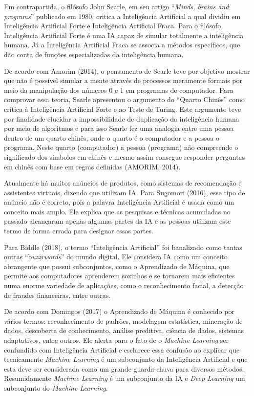 Em contrapartida, o filósofo John Searle, em seu artigo ``\emph{Minds,
brains and programs}'' publicado em 1980, critica a Inteligência
Artificial a qual dividiu em Inteligência Artificial Forte e
Inteligência Artificial Fraca. Para o filósofo, Inteligência Artificial
Forte é uma IA capaz de simular totalmente a inteligência humana. Já a
Inteligência Artificial Fraca se associa a métodos específicos, que dão
conta de funções especializadas da inteligência humana.

De acordo com Amorim (2014), o pensamento de Searle teve por objetivo
mostrar que não é possível simular a mente através de processos
meramente formais por meio da manipulação dos números 0 e 1 em programas
de computador. Para comprovar essa teoria, Searle apresentou o argumento
do ``Quarto Chinês'' como crítica à Inteligência Artificial Forte e ao
Teste de Turing. Este argumento teve por finalidade elucidar a
impossibilidade de duplicação da inteligência humana por meio de
algoritmos e para isso Searle fez uma analogia entre uma pessoa dentro
de um quarto chinês, onde o quarto é o computador e a pessoa o programa.
Neste quarto (computador) a pessoa (programa) não compreende o
significado dos símbolos em chinês e mesmo assim consegue responder
perguntas em chinês com base em regras definidas (AMORIM, 2014).

Atualmente há muitos anúncios de produtos, como sistemas de recomendação
e assistentes virtuais, dizendo que utilizam IA. Para Sugomori (2016),
esse tipo de anúncio não é correto, pois a palavra Inteligência
Artificial é usada como um conceito mais amplo. Ele explica que as
pesquisas e técnicas acumuladas no passado alcançaram apenas algumas
partes da IA e as pessoas utilizam este termo de forma errada para
designar essas partes.

Para Biddle (2018), o termo ``Inteligência Artificial'' foi banalizado
como tantas outras ``b\emph{uzzrwords}'' do mundo digital. Ele considera
IA como um conceito abrangente que possui subconjuntos, como o
Aprendizado de Máquina, que permite aos computadores aprenderem sozinhos
e se tornarem mais eficientes numa enorme variedade de aplicações, como
o reconhecimento facial, a detecção de fraudes financeiras, entre
outras.

De acordo com Domingos (2017) o Aprendizado de Máquina é conhecido por
vários termos: reconhecimento de padrões, modelagem estatística,
mineração de dados, descoberta de conhecimento, análise preditiva,
ciência de dados, sistemas adaptativos, entre outros. Ele alerta para o
fato de o \emph{Machine Learning} ser confundido com Inteligência
Artificial e esclarece essa confusão ao explicar que tecnicamente
\emph{Machine Learning} é um subconjunto da Inteligência Artificial e
que esta deve ser considerada como um grande guarda-chuva para diversos
métodos. Resumidamente \emph{Machine Learning} é um subconjunto da IA e
\emph{Deep Learning} um subconjunto do \emph{Machine Learning}.

